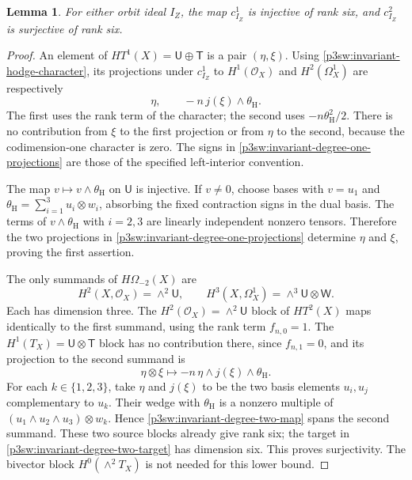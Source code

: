 \documentclass[11pt]{article}
\newtheorem{lemma}[theorem]{Lemma}
\numberwithin{equation}{section}
\begin{document}
\begin{lemma}\label{p3sw:invariant-one-factor-rank}
For either orbit ideal \(I_Z\), the map \(c_{I_Z}^1\) is injective of
rank six, and \(c_{I_Z}^2\) is surjective of rank six.
\end{lemma}

\begin{proof}
An element of \(HT^1(X)=\mathsf U\oplus\mathsf T\) is a pair
\((\eta,\xi)\).  Using \eqref{p3sw:invariant-hodge-character}, its
projections under \(c_{I_Z}^1\) to
\(H^1(\mathcal O_X)\) and \(H^2(\Omega_X^1)\) are respectively
\begin{equation}\label{p3sw:invariant-degree-one-projections}
 \eta,\qquad -n\,j(\xi)\wedge\theta_{\mathrm H}.
\end{equation}
The first uses the rank term of the character; the second uses
\(-n\theta_{\mathrm H}^2/2\).  There is no contribution from \(\xi\)
to the first projection or from \(\eta\) to the second, because the
codimension-one character is zero.  The signs in
\eqref{p3sw:invariant-degree-one-projections} are those of the specified
left-interior convention.

The map \(v\mapsto v\wedge\theta_{\mathrm H}\) on \(\mathsf U\) is
injective.  If \(v\ne0\), choose bases with \(v=u_1\) and
\(\theta_{\mathrm H}=\sum_{i=1}^3u_i\otimes w_i\), absorbing the fixed
contraction signs in the dual basis.  The terms of
\(v\wedge\theta_{\mathrm H}\) with \(i=2,3\) are linearly independent
nonzero tensors.  Therefore the two projections in
\eqref{p3sw:invariant-degree-one-projections} determine \(\eta\) and
\(\xi\), proving the first assertion.

The only summands of \(H\Omega_{-2}(X)\) are
\begin{equation}\label{p3sw:invariant-degree-two-target}
 H^2(X,\mathcal O_X)=\wedge^2\mathsf U,\qquad
 H^3(X,\Omega_X^1)=\wedge^3\mathsf U\otimes\mathsf W.
\end{equation}
Each has dimension three.  The
\(H^2(\mathcal O_X)=\wedge^2\mathsf U\) block of \(HT^2(X)\) maps
identically to the first summand, using the rank term \(f_{n,0}=1\).
The \(H^1(T_X)=\mathsf U\otimes\mathsf T\) block has no contribution
there, since \(f_{n,1}=0\), and its projection to the second summand is
\begin{equation}\label{p3sw:invariant-degree-two-map}
 \eta\otimes\xi\longmapsto
 -n\,\eta\wedge j(\xi)\wedge\theta_{\mathrm H}.
\end{equation}
For each \(k\in\{1,2,3\}\), take \(\eta\) and \(j(\xi)\) to be the two
basis elements \(u_i,u_j\) complementary to \(u_k\).  Their wedge with
\(\theta_{\mathrm H}\) is a nonzero multiple of
\((u_1\wedge u_2\wedge u_3)\otimes w_k\).  Hence
\eqref{p3sw:invariant-degree-two-map} spans the second summand.
These two source blocks already give rank six; the target in
\eqref{p3sw:invariant-degree-two-target} has dimension six.  This proves
surjectivity.  The bivector block \(H^0(\wedge^2T_X)\) is not needed
for this lower bound.
\end{proof}
\end{document}

